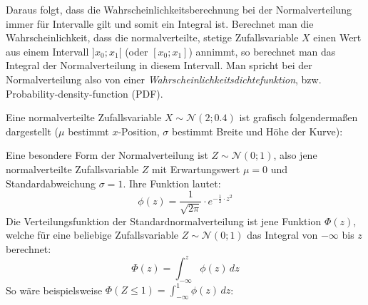 Daraus folgt, dass die Wahrscheinlichkeitsberechnung bei der Normalverteilung immer f\"{u}r Intervalle gilt und somit ein Integral ist. Berechnet man die Wahrscheinlichkeit, dass die normalverteilte, stetige Zufallsvariable $X$ einen Wert aus einem Intervall $]x_{0}; x_{1}[$ (oder $[x_{0};x_{1}]$) annimmt, so berechnet man das Integral der Normalverteilung in diesem Intervall. Man spricht bei der Normalverteilung also von einer \emph{Wahrscheinlichkeitsdichtefunktion}, bzw. Probability-density-function (PDF).

Eine normalverteilte Zufallsvariable $X \sim \mathcal{N}(2; 0.4)$ ist grafisch folgenderma\ss{}en dargestellt ($\mu$ bestimmt $x$-Position, $\sigma$ bestimmt Breite und H\"{o}he der Kurve):

\vspace{0.25cm}

\begin{figure}[h!]
\end{figure}

\pagebreak


Eine besondere Form der Normalverteilung ist $Z \sim \mathcal{N}(0; 1)$, also jene normalverteilte Zufallsvariable $Z$ mit Erwartungswert $\mu = 0$ und Standardabweichung $\sigma = 1$. Ihre Funktion lautet: $$\phi(z) = \frac{1}{\sqrt{2\pi}} \cdot e^{-\frac{1}{2} \cdot z^2}$$ Die Verteilungsfunktion der Standardnormalverteilung ist jene Funktion $\Phi(z)$, welche f\"{u}r eine beliebige Zufallsvariable $Z \sim \mathcal{N}(0; 1)$ das Integral von $-\infty$ bis $z$ berechnet: $$\Phi(z) = \int_{-\infty}^{z} \phi(z) \, dz$$ So w\"{a}re beispielsweise $\Phi(Z\leq1) = \int_{-\infty}^{1} \phi(z) \, dz$:

